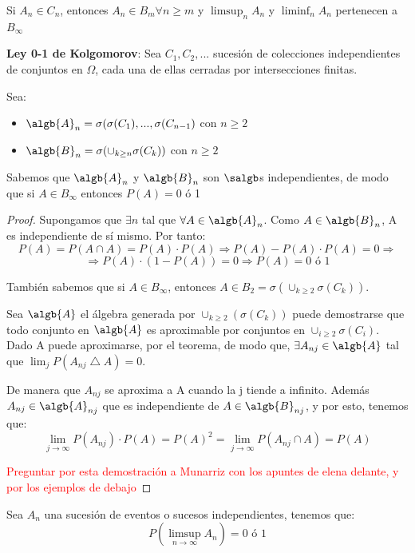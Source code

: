 \documentclass{apuntes}
\begin{document}
\begin{example}
Si $A_n \in C_n$, entonces $A_n \in B_m \forall n\geq m$ y $\limsup_n A_n$ y $\liminf_n A_n$ pertenecen a $B_{\infty}$ 
\end{example}

\textbf{Ley 0-1 de Kolgomorov}: Sea $C_1, C_2,...$ sucesión de colecciones independientes de conjuntos en $\Omega$, cada una de ellas cerradas por intersecciones finitas.

Sea:
\begin{itemize}
\item $\algb{A}_n=\sigma(\sigma(C_1),...,\sigma(C_{n-1})$ con $n\geq 2$
\item $\algb{B}_n=\sigma(\cup_{k\geq n} \sigma(C_k))$ con $n\geq 2$
\end{itemize} 

Sabemos que $\algb{A}_n$ y $\algb{B}_n$ son $\salgb$s independientes, de modo que si $A \in B_{\infty}$ entonces $P(A)=0$ ó 1
\begin{proof}
Supongamos que $\exists n$ tal que $\forall A \in \algb{A}_n$.  Como $A \in \algb{B}_n$, A es independiente de sí mismo. Por tanto:
\[
P(A)=P(A\cap A)=P(A)\cdot P(A) \Rightarrow P(A)-P(A)\cdot P(A)=0 \Rightarrow
\]
\[
\Rightarrow P(A)\cdot(1-P(A))=0 \Rightarrow P(A)=0 \text{ ó } 1
\]

También sabemos que si $A \in B_{\infty}$, entonces $A \in B_2 = \sigma(\cup_{k\geq 2}\sigma(C_k))$.

Sea $\algb{A}$ el álgebra generada por $\cup_{k\geq 2}(\sigma(C_k))$ puede demostrarse que todo conjunto en $\algb{A}$ es aproximable por conjuntos en $\cup_{i\geq 2} \sigma(C_i)$. Dado A puede aproximarse, por el teorema, de modo que, $\exists A_{nj} \in \algb{A}$ tal que $\lim_j P(A_{nj}\bigtriangleup A)=0$.

De manera que $A_{nj}$ se aproxima a A cuando la j tiende a infinito. Además $A_{nj}\in \algb{A}_{nj}$ que es independiente de $A \in \algb{B}_{nj}$, y por esto, tenemos que:
\[
\lim_{j \rightarrow \infty}P(A_{nj})\cdot P(A)=P(A)^2= \lim_{j \rightarrow \infty}P(A_{nj} \cap A)=P(A)
\]

\textcolor{red}{Preguntar por esta demostración a Munarriz con los apuntes de elena delante, y por los ejemplos de debajo}
\end{proof}

\begin{example}
Sea $A_n$ una sucesión de eventos o sucesos independientes, tenemos que:
\[
P(\limsup_{n \rightarrow \infty}A_n) = 0 \text{ ó } 1
\]
\end{example}
\end{document}
